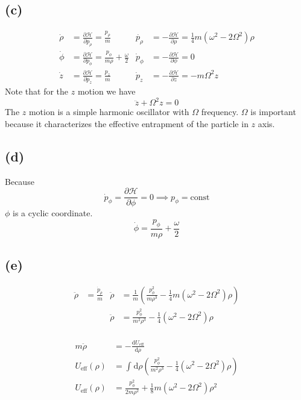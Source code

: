 \documentclass[letter, 10pts]{article}
\begin{document}
\subsection*{(c)}
\begin{align*}
	\dot{\rho} &= \frac{\partial \mathcal H}{\partial p_\rho} = \frac{p_\rho}{m} 
		   & \dot{p_\rho} &= - \frac{\partial \mathcal H}{\partial \rho}
		   = \frac{1}{4} m (\omega^2 - 2 \Omega^2) \rho \\
	\dot{\phi} &= \frac{\partial \mathcal H}{\partial p_\phi} = \frac{p_\phi}{m \rho} + \frac{\omega}{2}
		   & \dot{p}_\phi &= - \frac{\partial \mathcal H}{\partial \phi} = 0 \\
	\dot{{z}} &= \frac{\partial \mathcal H}{\partial p_z} = \frac{p_z}{m} 
		  & \dot{p}_z &= - \frac{\partial \mathcal H}{\partial z} = - m \Omega^2 z
\end{align*}
Note that for the $z$ motion we have 
\[
\ddot{z} + \Omega^2 z = 0
\] 
The $z$ motion is a simple harmonic oscillator with $\Omega$ frequency. $\Omega$ is important because it characterizes the effective entrapment of the particle in $z$ axis.


\subsection*{(d)} 
Because 
\[
\dot{p}_\phi = \frac{\partial \mathcal H}{\partial \phi} = 0 \implies p_\phi = \text{const}
\] 
$\phi$ is a cyclic coordinate. 
\[
\dot{\phi} = \frac{p_\phi}{m \rho} + \frac{\omega}{2}
\]



\subsection*{(e)}
\begin{align*}
	\ddot{\rho} &= \frac{\dot p_\rho}{m} &\ddot{\rho}&=\frac{1}{m}
	\left(\frac{p_\phi^2}{m \rho^3 } - \frac{1}{4} m \left(\omega^2 - 2 \Omega^2\right)\rho\right)\\
		    & & 
	\ddot{\rho} &= 
\frac{p_\phi^2}{m^2 \rho^3 } - \frac{1}{4}  \left(\omega^2 - 2 \Omega^2\right)\rho \\
\end{align*}


\begin{align*}
	m \ddot{\rho} &= - \frac{\mathrm{d} U_\text{eff}}{\mathrm{d} \rho} \\ 
	U_\text{eff} (\rho) &= \int_{}^{} \mathrm{d} \rho \left(
\frac{p_\phi^2}{m^2 \rho^3 } - \frac{1}{4}  \left(\omega^2 - 2 \Omega^2\right)\rho 
	\right)
	\\
	U_\text{eff}(\rho)		    &=
			    \frac{p_\phi^2}{2 m \rho^2} + \frac{1}{8} m \left(\omega^2 - 2 \Omega^2\right) \rho ^2
\end{align*}
\end{document}
